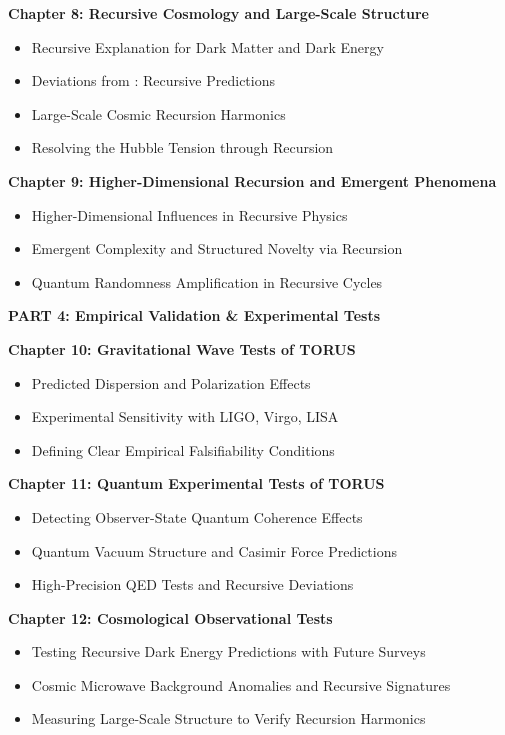 \documentclass[
]{article}
\begin{document}
\textbf{Chapter 8: Recursive Cosmology and Large-Scale Structure}

\begin{itemize}
\item
  Recursive Explanation for Dark Matter and Dark Energy
\item
  Deviations from \LambdaCDM: Recursive Predictions
\item
  Large-Scale Cosmic Recursion Harmonics
\item
  Resolving the Hubble Tension through Recursion
\end{itemize}

\textbf{Chapter 9: Higher-Dimensional Recursion and Emergent Phenomena}

\begin{itemize}
\item
  Higher-Dimensional Influences in Recursive Physics
\item
  Emergent Complexity and Structured Novelty via Recursion
\item
  Quantum Randomness Amplification in Recursive Cycles
\end{itemize}

\textbf{PART 4: Empirical Validation \& Experimental Tests}

\textbf{Chapter 10: Gravitational Wave Tests of TORUS}

\begin{itemize}
\item
  Predicted Dispersion and Polarization Effects
\item
  Experimental Sensitivity with LIGO, Virgo, LISA
\item
  Defining Clear Empirical Falsifiability Conditions
\end{itemize}

\textbf{Chapter 11: Quantum Experimental Tests of TORUS}

\begin{itemize}
\item
  Detecting Observer-State Quantum Coherence Effects
\item
  Quantum Vacuum Structure and Casimir Force Predictions
\item
  High-Precision QED Tests and Recursive Deviations
\end{itemize}

\textbf{Chapter 12: Cosmological Observational Tests}

\begin{itemize}
\item
  Testing Recursive Dark Energy Predictions with Future Surveys
\item
  Cosmic Microwave Background Anomalies and Recursive Signatures
\item
  Measuring Large-Scale Structure to Verify Recursion Harmonics
\end{itemize}
\end{document}
